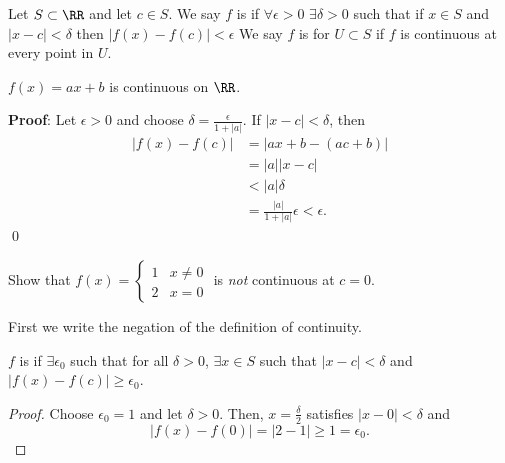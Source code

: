 \begin{definition}
Let $S\subset \RR$ and let $c\in S$. We say $f$ is  if $\forall \epsilon>0$ $\exists\delta>0$ such that if $x\in S$ and $|x-c|<\delta$ then $|f(x) - f(c)|< \epsilon$ We say $f$ is  for $U\subset S$ if $f$ is continuous at every point in $U$.
\end{definition}

\begin{example}
$f(x) = ax+b$ is continuous on $\RR$.
\end{example}
\textbf{Proof}: Let $\epsilon>0$ and choose $\delta = \frac{\epsilon}{1+|a|}$. If $|x-c|<\delta$, then
\begin{align*}
|f(x) -f(c)| &= |ax+b-(ac+b)| \\
&= |a||x-c| \\
&< |a|\delta \\
&= \frac{|a|}{1+|a|}\epsilon < \epsilon.
\end{align*}
\qed 

\begin{example}
Show that $f(x) = \begin{cases}1 & x\neq 0 \\ 2 & x=0\end{cases}$ is \textit{not} continuous at $c = 0$.
\end{example}

First we write the negation of the definition of continuity.

\begin{negation}
$f$ is  if $\exists \epsilon_0$ such that for all $\delta>0$, $\exists x\in S$ such that $|x-c| < \delta$ and $|f(x) - f(c)| \geq \epsilon_0$.
\end{negation}
\begin{proof}
Choose $\epsilon_0 = 1$ and let $\delta>0$. Then, $x = \frac{\delta}{2}$ satisfies $|x-0| < \delta$ and \[|f(x) - f(0)| = |2-1| \geq 1 = \epsilon_0.\]
\end{proof}


